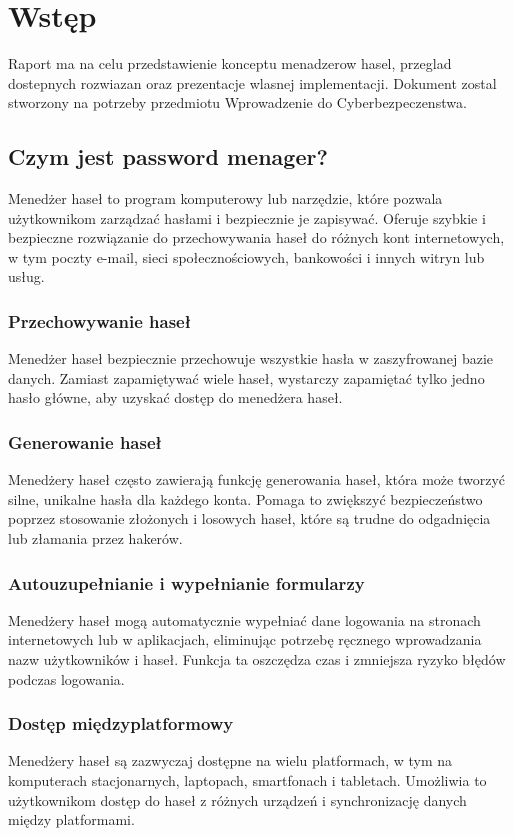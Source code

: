 \section{Wstęp}
Raport ma na celu przedstawienie konceptu menadzerow hasel, przeglad dostepnych rozwiazan oraz prezentacje wlasnej implementacji. Dokument zostal stworzony na potrzeby przedmiotu Wprowadzenie do Cyberbezpeczenstwa. 

\subsection{Czym jest password menager?}
Menedżer haseł to program komputerowy lub narzędzie, które pozwala użytkownikom zarządzać hasłami i bezpiecznie je zapisywać. Oferuje szybkie i bezpieczne rozwiązanie do przechowywania haseł do różnych kont internetowych, w tym poczty e-mail, sieci społecznościowych, bankowości i innych witryn lub usług.
\subsubsection{Przechowywanie haseł}
Menedżer haseł bezpiecznie przechowuje wszystkie hasła w zaszyfrowanej bazie danych. Zamiast zapamiętywać wiele haseł, wystarczy zapamiętać tylko jedno hasło główne, aby uzyskać dostęp do menedżera haseł.
\subsubsection{Generowanie haseł}
Menedżery haseł często zawierają funkcję generowania haseł, która może tworzyć silne, unikalne hasła dla każdego konta. Pomaga to zwiększyć bezpieczeństwo poprzez stosowanie złożonych i losowych haseł, które są trudne do odgadnięcia lub złamania przez hakerów.
\subsubsection{Autouzupełnianie i wypełnianie formularzy}
Menedżery haseł mogą automatycznie wypełniać dane logowania na stronach internetowych lub w aplikacjach, eliminując potrzebę ręcznego wprowadzania nazw użytkowników i haseł. Funkcja ta oszczędza czas i zmniejsza ryzyko błędów podczas logowania.
\subsubsection{Dostęp międzyplatformowy}
Menedżery haseł są zazwyczaj dostępne na wielu platformach, w tym na komputerach stacjonarnych, laptopach, smartfonach i tabletach. Umożliwia to użytkownikom dostęp do haseł z różnych urządzeń i synchronizację danych między platformami.
